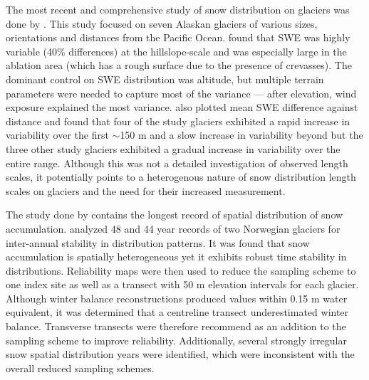 \documentclass{sfuthesis}
\begin{document}
The most recent and comprehensive study of snow distribution on glaciers was done by \cite{McGrath2015}. This study focused on seven Alaskan glaciers of various sizes, orientations and distances from the Pacific Ocean. \cite{McGrath2015} found that SWE was highly variable (40$\%$ differences) at the hillslope-scale and was especially large in the ablation area (which has a rough surface due to the presence of crevasses). The dominant control on SWE distribution was altitude, but multiple terrain parameters were needed to capture most of the variance --- after elevation, wind exposure explained the most variance. \cite{McGrath2015} also plotted mean SWE difference against distance and found that four of the study glaciers exhibited a rapid increase in variability over the first $\sim$150 m and a slow increase in variability beyond but the three other study glaciers exhibited a gradual increase in variability over the entire range. Although this was not a detailed investigation of observed length scales, it potentially points to a heterogenous nature of snow distribution length scales on glaciers and the need for their increased measurement.

The study done by \cite{Walmsley2015} contains the longest record of spatial distribution of snow accumulation. \cite{Walmsley2015} analyzed 48 and 44 year records of two Norwegian glaciers for inter-annual stability in distribution patterns. It was found that snow accumulation is spatially heterogeneous yet it exhibits robust time stability in distributions. Reliability maps were then used to reduce the sampling scheme to one index site as well as a transect with 50 m elevation intervals for each glacier. Although winter balance reconstructions produced values within 0.15 m water equivalent, it was determined that a centreline transect underestimated winter balance. Transverse transects were therefore recommend as an addition to the sampling scheme to improve reliability. Additionally, several strongly irregular snow spatial distribution years were identified, which were inconsistent with the overall reduced sampling schemes. 
\end{document}
